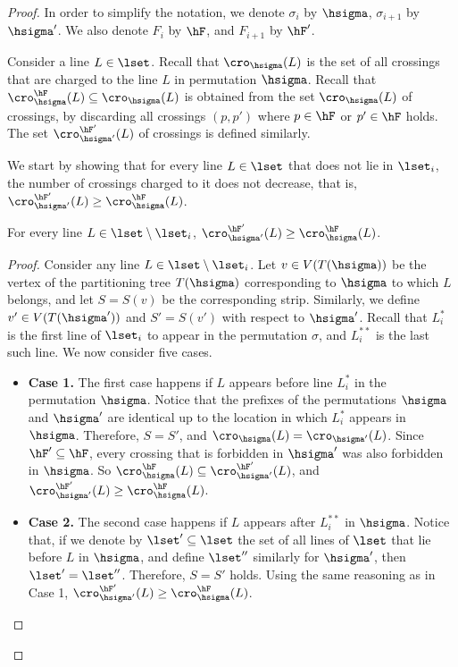 \begin{proof}
	In order to simplify the notation, we denote $\sigma_i$ by $\hsigma$, $\sigma_{i+1}$ by $\hsigma'$. We also denote $F_i$ by $\hF$, and $F_{i+1}$ by $\hF'$.
	
	
	Consider a line $L\in \lset$. Recall that $\cro_{\hsigma}(L)$ is the set of all crossings that are charged to the line $L$ in permutation $\hsigma$. Recall that $\cro^{\hF}_{\hsigma}(L)\subseteq \cro_{\hsigma}(L)$ is obtained from the set  $\cro_{\hsigma}(L)$ of crossings, by discarding all crossings $(p,p')$ where $p\in \hF$ or $p'\in \hF$ holds. The set $\cro^{\hF'}_{\hsigma'}(L)$ of crossings is defined similarly.
	
	We start by showing that for every line $L\in \lset$ that does not lie in $\lset_i$, the number of crossings charged to it does not decrease, that is, $\cro^{\hF'}_{\hsigma'}(L)\geq\cro^{\hF}_{\hsigma}(L)$.
	
	\begin{claim}\label{claim: lines outside of block do not change}
		For every line $L\in \lset\setminus \lset_i$, $\cro^{\hF'}_{\hsigma'}(L)\geq\cro^{\hF}_{\hsigma}(L)$.
	\end{claim}
	\begin{proof}
		Consider any line $L\in \lset\setminus \lset_i$. Let $v\in V(T({\hsigma}))$ be the vertex of the partitioning tree $T({\hsigma})$ corresponding to $\hsigma$ to which $L$ belongs, and let $S=S(v)$ be the corresponding strip. Similarly, we define $v'\in V(T({\hsigma'}))$ and $S'=S(v')$ with respect to $\hsigma'$.  
		Recall that $L^*_i$ is the first line of $\lset_i$ to appear in the permutation $\sigma$, and $L^{**}_i$ is the last such line. We now consider five cases.
		\begin{itemize}
		    \item 	{\bf Case 1.}	The first case happens if $L$ appears before line $L^*_i$ in the permutation $\hsigma$. Notice that the prefixes of the permutations $\hsigma$ and $\hsigma'$ are identical up to the location in which $L^*_i$ appears in $\hsigma$. Therefore, $S=S'$, and $\cro_{\hsigma}(L)=\cro_{\hsigma'}(L)$. Since $\hF'\subseteq \hF$, every crossing that is forbidden in $\hsigma'$ was also forbidden in $\hsigma$. So $\cro_{\hsigma}^{\hF}(L)\subseteq \cro_{\hsigma'}^{\hF'}(L)$, and $\cro^{\hF'}_{\hsigma'}(L)\geq\cro^{\hF}_{\hsigma}(L)$.
		    
		    \item 	{\bf Case 2.} The second case happens if $L$ appears after $L^{**}_i$ in $\hsigma$. Notice that, if we denote by $\lset'\subseteq \lset$ the set of all lines of $\lset$ that lie before $L$ in $\hsigma$, and define $\lset''$ similarly for $\hsigma'$, then $ \lset'=\lset''$. Therefore, $S=S'$ holds. Using the same reasoning as in Case 1,  $\cro^{\hF'}_{\hsigma'}(L)\geq\cro^{\hF}_{\hsigma}(L)$.
		    

\end{itemize}
\end{proof}
\end{proof}
